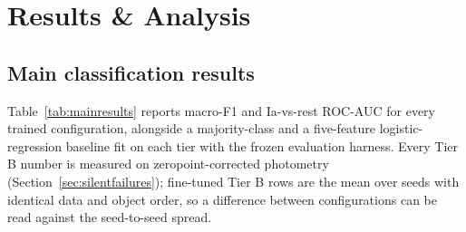 \chapter{Results \& Analysis}
\label{sec:results}

\section{Main classification results}

Table~\ref{tab:mainresults} reports macro-F1 and Ia-vs-rest ROC-AUC for
every trained configuration, alongside a majority-class and a five-feature
logistic-regression baseline fit on each tier with the frozen evaluation
harness. Every Tier B number is measured on zeropoint-corrected photometry
(Section~\ref{sec:silentfailures}); fine-tuned Tier B rows are the mean over
\TierBNSeeds{} seeds with identical data and object order, so a difference
between configurations can be read against the seed-to-seed spread.

